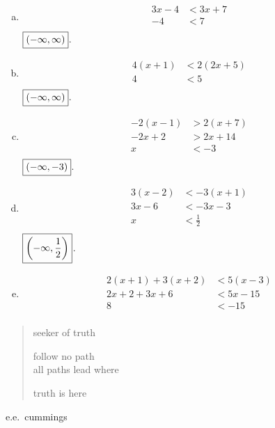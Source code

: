 \documentclass[letterpaper, landscape]{exam}
\begin{document}
\begin{description}
\begin{enumerate}[(a)]
          \item
            \begin{align*}
              3x - 4 & < 3x + 7 \\
              -4     & < 7 \\
            \end{align*}
            $\boxed{ \intoo{ -\infty, \infty } }$.

          \item
            \begin{align*}
              4(x + 1) & < 2(2x + 5) \\
              4        & < 5 \\
            \end{align*}
            $\boxed{ \intoo{ -\infty, \infty } }$.

          \item
            \begin{align*}
              -2(x - 1) & > 2(x + 7) \\
              -2x + 2   & > 2x + 14\\
              x         & < -3\\
            \end{align*}
            $\boxed{ \intoo{ -\infty, -3 } }$.

          \item
            \begin{align*}
              3(x - 2) & < -3(x + 1) \\
              3x - 6   & < -3x - 3 \\
              x        & < \frac{1}{2} \\
            \end{align*}
            $\boxed{ \intoo{ -\infty, \frac{1}{2} } }$.

          \item
            \begin{align*}
              2(x + 1) + 3(x + 2) & < 5(x - 3) \\
              2x + 2 + 3x + 6     & < 5x - 15 \\
              8                   & < -15 \\
            \end{align*}

        \end{enumerate}
    \end{description}
  \fi

  \ifprintanswers{}
  \else
    \vspace{5 in}

    \begin{verse}
      seeker of truth

      follow no path \\
      all paths lead where

      truth is here 
    \end{verse}
    \hspace{1 in} e.e.\ cummings

  \fi
\end{document}
